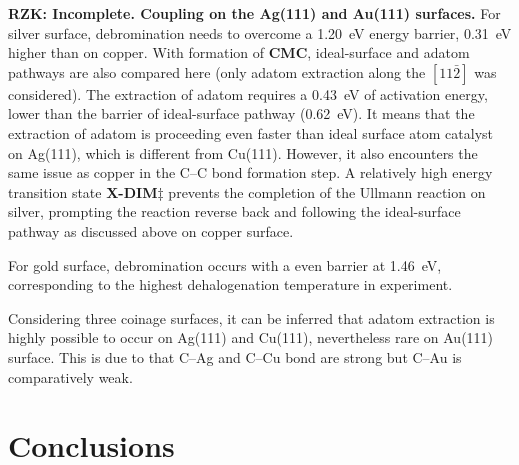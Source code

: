 \documentclass[%
 reprint,
 amsmath,amssymb,
 aps,
prb,
floatfix,
]{revtex4-2}
\newcommand{\zhzh}{\color{blue}}
\newcommand{\zhzh}{\color{blue}}
\newcommand{\comm}{\color{ForestGreen}} %
\begin{document}
{\zhzh 

\textbf{{\comm RZK: Incomplete.} Coupling on the Ag(111) and Au(111) surfaces.}
%
For silver surface, debromination needs to overcome a \SI{1.20}{\electronvolt} energy barrier, \SI{0.31}{\electronvolt} higher than on copper. With formation of \textbf{CMC}, ideal-surface and adatom pathways are also compared here (only adatom extraction along the $[11\bar{2}]$ was considered). The extraction of adatom requires a \SI{0.43}{\electronvolt} of activation energy, lower than the barrier of ideal-surface pathway (\SI{0.62}{\electronvolt}). It means that the extraction of adatom is proceeding even faster than ideal surface atom catalyst on Ag(111), which is different from Cu(111). However, it also encounters the same issue as copper in the C--C bond formation step. A relatively high energy transition state \textbf{X-DIM$\ddagger$} prevents the completion of the Ullmann reaction on silver, prompting the reaction reverse back and following the ideal-surface pathway as discussed above on copper surface. 

For gold surface, debromination occurs with a even barrier at \SI{1.46}{\electronvolt}, corresponding to the highest dehalogenation temperature in experiment.

Considering three coinage surfaces, it can be inferred that adatom extraction is highly possible to occur on Ag(111) and Cu(111), nevertheless rare on Au(111) surface. This is due to that C--Ag and C--Cu bond are strong but C--Au is comparatively weak.
 
}

\section{Conclusions}


\end{document}

